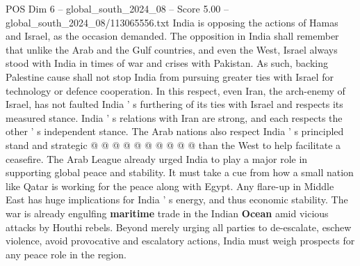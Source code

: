 \begin{textsample}{POS Dim 6 – global\_south\_2024\_08 – Score 5.00 – global\_south\_2024\_08/113065556.txt}
India is opposing the actions of Hamas and Israel, as the occasion demanded.
The opposition in India shall remember that unlike the Arab and the Gulf countries, and even the West, Israel always stood with India in times of war and crises with Pakistan.
As such, backing Palestine cause shall not stop India from pursuing greater ties with Israel for technology or defence cooperation.
In this respect, even Iran, the arch-enemy of Israel, has not faulted India ' s furthering of its ties with Israel and respects its measured stance.
India ' s relations with Iran are strong, and each respects the other ' s independent stance.
The Arab nations also respect India ' s principled stand and strategic @ @ @ @ @ @ @ @ @ @ than the West to help facilitate a ceasefire.
The Arab League already urged India to play a major role in supporting global peace and stability.
It must take a cue from how a small nation like Qatar is working for the peace along with Egypt.
Any flare-up in Middle East has huge implications for India ' s energy, and thus economic stability.
The war is already engulfing \textbf{maritime} trade in the Indian \textbf{Ocean} amid vicious attacks by Houthi rebels.
Beyond merely urging all parties to de-escalate, eschew violence, avoid provocative and escalatory actions, India must weigh prospects for any peace role in the region.

\end{textsample}
